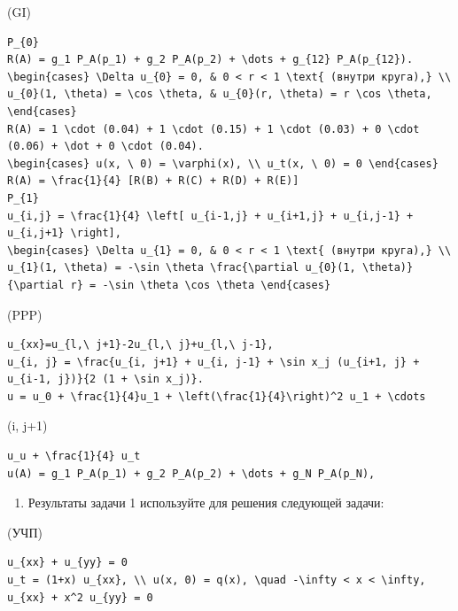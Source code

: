 \documentclass[
  ukrainian,
]{article}
\providecommand{\tightlist}{%
  \setlength{\itemsep}{0pt}\setlength{\parskip}{0pt}}
\begin{document}
(GI)

\begin{verbatim}
P_{0}
R(A) = g_1 P_A(p_1) + g_2 P_A(p_2) + \dots + g_{12} P_A(p_{12}).
\begin{cases} \Delta u_{0} = 0, & 0 < r < 1 \text{ (внутри круга),} \\ u_{0}(1, \theta) = \cos \theta, & u_{0}(r, \theta) = r \cos \theta, \end{cases}
R(A) = 1 \cdot (0.04) + 1 \cdot (0.15) + 1 \cdot (0.03) + 0 \cdot (0.06) + \dot + 0 \cdot (0.04).
\begin{cases} u(x, \ 0) = \varphi(x), \\ u_t(x, \ 0) = 0 \end{cases}
R(A) = \frac{1}{4} [R(B) + R(C) + R(D) + R(E)]
P_{1}
u_{i,j} = \frac{1}{4} \left[ u_{i-1,j} + u_{i+1,j} + u_{i,j-1} + u_{i,j+1} \right],
\begin{cases} \Delta u_{1} = 0, & 0 < r < 1 \text{ (внутри круга),} \\ u_{1}(1, \theta) = -\sin \theta \frac{\partial u_{0}(1, \theta)}{\partial r} = -\sin \theta \cos \theta \end{cases}
\end{verbatim}

(PPP)

\begin{verbatim}
u_{xx}=u_{l,\ j+1}-2u_{l,\ j}+u_{l,\ j-1},
u_{i, j} = \frac{u_{i, j+1} + u_{i, j-1} + \sin x_j (u_{i+1, j} + u_{i-1, j})}{2 (1 + \sin x_j)}.
u = u_0 + \frac{1}{4}u_1 + \left(\frac{1}{4}\right)^2 u_1 + \cdots
\end{verbatim}

(i, j+1)

\begin{verbatim}
u_u + \frac{1}{4} u_t
u(A) = g_1 P_A(p_1) + g_2 P_A(p_2) + \dots + g_N P_A(p_N),
\end{verbatim}

\begin{enumerate}
\def\labelenumi{\arabic{enumi}.}
\setcounter{enumi}{1}
\tightlist
\item
  Результаты задачи 1 используйте для решения следующей задачи:
\end{enumerate}

(УЧП)

\begin{verbatim}
u_{xx} + u_{yy} = 0
u_t = (1+x) u_{xx}, \\ u(x, 0) = q(x), \quad -\infty < x < \infty,
u_{xx} + x^2 u_{yy} = 0
\end{verbatim}
\end{document}

